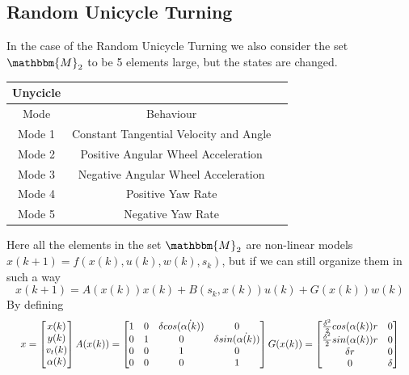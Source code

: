 \documentclass[twocolumn]{article}
\begin{document}
\subsection*{Random Unicycle Turning}
In the case of the Random Unicycle Turning we also consider the set $\mathbbm{M}_{2}$ to be 5 elements large, but the states are changed.
    \begin{center}
        \begin{tabular}{||c||c |c |}%
            \hline
             Unycicle  \\
            \hline\hline
            Mode & Behaviour  \\ [0.5ex]
            \hline\hline
            Mode 1 & Constant Tangential Velocity and Angle \\
            \hline
            Mode 2  & Positive Angular Wheel Acceleration  \\
            \hline
            Mode 3  & Negative Angular Wheel Acceleration \\
            \hline
            Mode 4  & Positive Yaw Rate  \\
            \hline
            Mode 5  & Negative Yaw Rate   \\ [1ex]
            \hline
        \end{tabular}
    \end{center}
Here all the elements in the set $\mathbbm{M}_{2}$ are non-linear models $x(k+1)=f(x(k),u(k),w(k),s_{k})$, but if we can still organize them in such a way
    \begin{equation}
        x(k+1)= A(x(k))x(k) + B(s_{k},x(k))u(k) + G(x(k))w(k)
    \end{equation}
By defining
    \begin{equation*}      
     \resizebox{.99\columnwidth}{!}{ $ x=\begin{bmatrix} x(k) \\ y(k) \\ v_{t}(k) \\ \alpha(k) \\ \end{bmatrix}  
        A(x(k))=\begin{bmatrix}
            1 & 0 & \delta cos(\dot{\alpha (k)}) & 0      \\
            0 & 1 & 0      & \delta sin(\dot{\alpha (k)}) \\
            0 & 0 & 1      & 0      \\
            0 & 0 & 0      & 1      \\
        \end{bmatrix}
         G(x(k))=\begin{bmatrix}
            \frac{\delta^{2}}{2} cos(\alpha (k))r & 0  \\
            \frac{\delta^{2}}{2} sin(\alpha (k))r & 0 \\
            \delta r    & 0          \\
            0 & \delta     \\
        \end{bmatrix}
    $ } \end{equation*}
\end{document}
